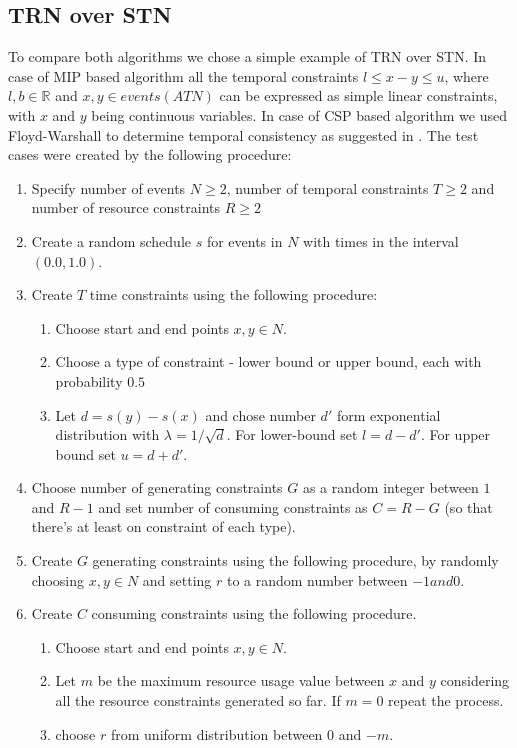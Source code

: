 \subsection{TRN over STN}
To compare both algorithms we chose a simple example of TRN over STN. In case of MIP based algorithm all the temporal constraints $l \leq x - y \leq u$, where $l,b \in \mathbb{R}$ and $x,y \in events(ATN)$ can be expressed as simple linear constraints, with $x$ and $y$ being continuous variables. In case of CSP based algorithm we used Floyd-Warshall to determine temporal consistency as suggested in \cite{dechter1991temporal}. The test cases were created by the following procedure:
\begin{enumerate}
\item Specify number of events $N \geq 2$, number of temporal constraints $T\geq 2$ and number of resource constraints $R\geq 2$
\item Create a random schedule $s$ for events in $N$ with times in the interval $(0.0, 1.0)$.
\item Create $T$ time constraints using the following procedure:
  \begin{enumerate}
  \item Choose start and end points $x,y \in N$.
  \item Choose a type of constraint - lower bound or upper bound, each with probability $0.5$
  \item Let $d=s(y) - s(x)$ and chose number $d'$ form exponential distribution with $\lambda = 1 / \sqrt{d}$. For lower-bound set $l = d - d'$. For upper bound set $u = d + d'$.
  \end{enumerate}
\item Choose number of generating constraints $G$ as a random integer between $1$ and $R-1$ and set number of consuming constraints as $C = R - G$ (so that there's at least on constraint of each type).
\item Create $G$ generating constraints using the following procedure, by randomly choosing $x,y \in N$ and setting $r$ to a random number between $-1 and 0$.
\item Create $C$ consuming constraints using the following procedure.
  \begin{enumerate}
  \item Choose start and end points $x,y \in N$.
  \item Let $m$ be the maximum resource usage value between $x$ and $y$ considering all the resource constraints generated so far. If $m = 0$ repeat the process.
  \item choose $r$ from uniform distribution between $0$ and $-m$.
  \end{enumerate}
\end{enumerate}

